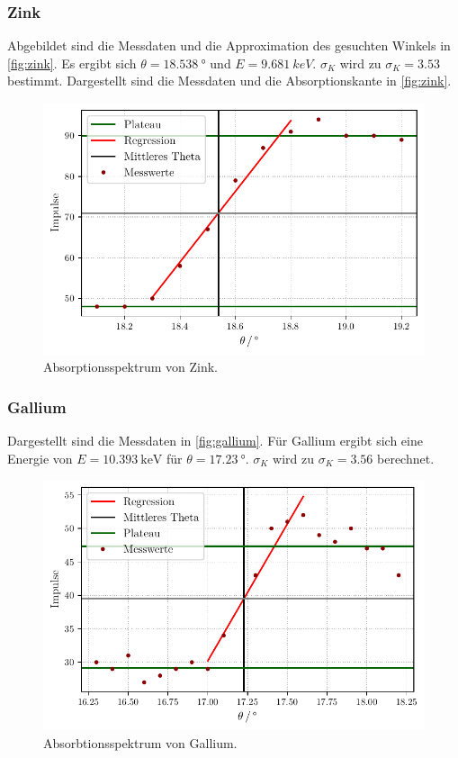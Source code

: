 \subsubsection{Zink}
Abgebildet sind die Messdaten und die Approximation des gesuchten Winkels in \autoref{fig:zink}.
Es ergibt sich $\theta = \qty{18.538}{°}$ und $E = \qty{9.681}{keV}$.
$\sigma_K$ wird zu $\sigma_K = 3.53$ bestimmt.
Dargestellt sind die Messdaten und die Absorptionskante in \autoref{fig:zink}.
\begin{figure}[H]
  \centering
  \caption{Absorptionsspektrum von Zink.}
  \label{fig:zink}
  \includegraphics[width=0.5 \linewidth]{build/zink.pdf}
\end{figure}

\subsubsection{Gallium}
Dargestellt sind die Messdaten in \autoref{fig:gallium}.
Für Gallium ergibt sich eine Energie von $E = \qty{10.393}{\keV}$ für $\theta = \qty{17.23}{°}$.
$\sigma_K$ wird zu $\sigma_K = 3.56$ berechnet.
\begin{figure}[H]
  \centering
  \caption{Absorbtionsspektrum von Gallium.}
  \label{fig:gallium}
  \includegraphics[width=0.5 \linewidth]{build/gallium.pdf}
\end{figure}

